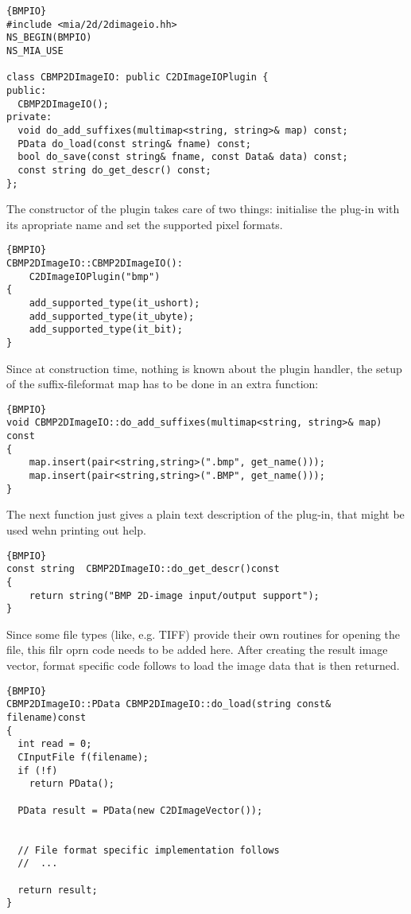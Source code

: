 \documentclass[english, 10pt, a4paper,headsepline,openany]{scrbook}
\begin{document}
\begin{lstlisting}{BMPIO}
#include <mia/2d/2dimageio.hh>
NS_BEGIN(BMPIO)
NS_MIA_USE

class CBMP2DImageIO: public C2DImageIOPlugin {
public:
  CBMP2DImageIO();
private: 
  void do_add_suffixes(multimap<string, string>& map) const;
  PData do_load(const string& fname) const;
  bool do_save(const string& fname, const Data& data) const;
  const string do_get_descr() const; 
};
\end{lstlisting}

\noindent 
The constructor of the plugin takes care of two things: initialise the plug-in with its apropriate name and set the supported pixel formats. 

\begin{lstlisting}{BMPIO}
CBMP2DImageIO::CBMP2DImageIO():
	C2DImageIOPlugin("bmp")
{
	add_supported_type(it_ushort);
	add_supported_type(it_ubyte); 
	add_supported_type(it_bit);
}
\end{lstlisting}

\noindent 
Since at construction time, nothing is known about the plugin handler, the setup of the suffix-fileformat map has to be done in an extra function: 
\begin{lstlisting}{BMPIO}
void CBMP2DImageIO::do_add_suffixes(multimap<string, string>& map) const
{
	map.insert(pair<string,string>(".bmp", get_name())); 
	map.insert(pair<string,string>(".BMP", get_name())); 
}
\end{lstlisting}


\noindent 
The next function just gives a plain text description of the plug-in, that might be used wehn printing out help. 
\begin{lstlisting}{BMPIO}
const string  CBMP2DImageIO::do_get_descr()const
{
	return string("BMP 2D-image input/output support");
}
\end{lstlisting}

\noindent 
Since some file types (like, e.g. TIFF) provide their own routines for opening the file, this filr oprn code needs to be added here.
After creating the result image vector, format specific code follows to load the image data that is then returned. 
\begin{lstlisting}{BMPIO}
CBMP2DImageIO::PData CBMP2DImageIO::do_load(string const& filename)const
{
  int read = 0; 
  CInputFile f(filename);
  if (!f)
    return PData(); 

  PData result = PData(new C2DImageVector()); 

 
  // File format specific implementation follows
  //  ...
	
  return result; 
}
\end{lstlisting}
\end{document}
